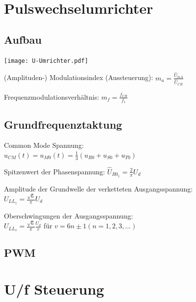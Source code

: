 \documentclass[german]{latex4ei_fs}
\begin{document}
\section{Pulswechselumrichter}
\begin{sectionbox}
\subsection{Aufbau}

\texttt{[image: U-Umrichter.pdf]}

(Amplituden-) Modulationsindex (Aussteuerung): $m_a = \frac{\hat U_{mA}}{\hat U_{CR}}$

Frequenzmodulationsverhältnis: $m_f = \frac{f_{CR}}{f_1}$
\end{sectionbox}
\begin{sectionbox}
\subsection{Grundfrequenztaktung}
Common Mode Spannung: \\
$u_{CM} (t) = u_{M0} (t) = \frac{1}{3} (u_{R0} + u_{S0} + u_{T0})$

Spitzenwert der Phasenspannung:
$\hat U_{R0_1} = \frac{2}{\pi} U_d$


Amplitude der Grundwelle der verketteten Ausgangsspannung: \\
$U_{LL_1} = \frac{\sqrt 6}{\pi} U_d$

Oberschwingungen der Ausgangsspannung: \\
$U_{LL_v} = \frac{\sqrt 6}{\pi} \frac{U_d}{v}$ für $v = 6n \pm 1 (n = 1, 2, 3, \ldots)$
\end{sectionbox}
\begin{sectionbox}
\subsection{PWM}  
\end{sectionbox}

\section{U/f Steuerung}
\end{document}
